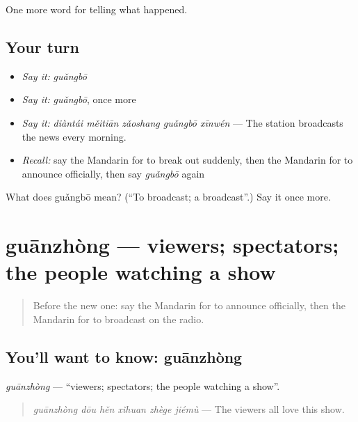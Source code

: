 \begin{grammarlens}[title={What you've built}]
One more word for telling what happened.
\end{grammarlens}

\subsection*{Your turn}
\begin{itemize}
\raggedright
  \item \emph{Say it:} \emph{guǎngbō}
  \item \emph{Say it:} \emph{guǎngbō}, once more
  \item \emph{Say it:} \emph{diàntái měitiān zǎoshang guǎngbō xīnwén} — The station broadcasts the news every morning.
  \item \emph{Recall:} say the Mandarin for to break out suddenly, then the Mandarin for to announce officially, then say \emph{guǎngbō} again
\end{itemize}

\begin{tcolorbox}[breakable,colback=teal!4,colframe=teal!35!black,title={Before you move on}]
What does guǎngbō mean? (\textquotedblleft{}To broadcast; a broadcast\textquotedblright{}.) Say it once more.
\end{tcolorbox}
\section[guānzhòng]{guānzhòng — viewers; spectators; the people watching a show}

\label{lesson:ZH-C292-guanzhong}



\begin{quote}
Before the new one: say the Mandarin for to announce officially, then the Mandarin for to broadcast on the radio.
\end{quote}

\subsection*{You'll want to know: guānzhòng}
\emph{guānzhòng} — \textquotedblleft{}viewers; spectators; the people watching a show\textquotedblright{}.

\begin{quote}
\emph{guānzhòng dōu hěn xǐhuan zhège jiémù} — The viewers all love this show.
\end{quote}

